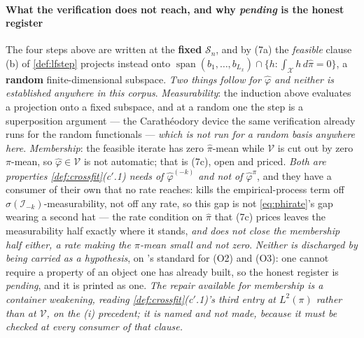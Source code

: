 \paragraph{What the verification does \textbf{not} reach, and why \emph{pending} is the honest register}

The four steps above are written at the \textbf{fixed} $\mathcal S_n$, and by
\textup{(7a)} the \emph{feasible} clause \textup{(b)} of \cref{def:lfstep}
projects instead onto
$\operatorname{span}(b_1,\dots,b_{L_x})\cap\{h:\int_{\mathcal X}h\,d\hat\pi=0\}$, a \textbf{random}
finite-dimensional subspace. \emph{Two things follow for $\hat\varphi$ and neither is established
anywhere in this corpus}. \emph{Measurability}: the induction above evaluates a projection onto a
fixed subspace, and at a random one the step is a superposition argument --- the Carath\'eodory device
the same verification already runs for the random functionals  --- \emph{which is not
run for a random basis anywhere here}. \emph{Membership}: the feasible iterate has zero $\hat\pi$-mean
while $\mathcal V$ is cut out by zero $\pi$-mean, so $\hat\varphi\in\mathcal V$ is not automatic; that
is \textup{(7c)}, open and priced. \emph{Both are properties
\cref{def:crossfit}\textup{(c$'$.1)} needs of $\hat\varphi^{(-k)}$ and not of $\hat\varphi^{\pi}$}, and
they have a consumer of their own that no rate reaches:  kills the
empirical-process term off $\sigma(\mathcal I_{-k})$-measurability, not off any rate, so this gap is
not \eqref{eq:phirate}'s gap wearing a second hat --- the rate condition on $\hat\pi$ that
\textup{(7c)} prices leaves the measurability half exactly where it stands, \emph{and does not close
the membership half either, a rate making the $\pi$-mean small and not zero}. \emph{Neither is
discharged by being carried as a hypothesis}, on 's standard for
\textup{(O2)} and \textup{(O3)}: one cannot require a property of an object one has already built, so
the honest register is \emph{pending}, and it is printed as one. \emph{The repair available for
membership is a container weakening, reading \cref{def:crossfit}\textup{(c$'$.1)}'s third entry at
$L^{2}(\pi)$ rather than at $\mathcal V$, on the \textup{(i)} precedent; it is
named and not made, because it must be checked at every consumer of that clause.}

